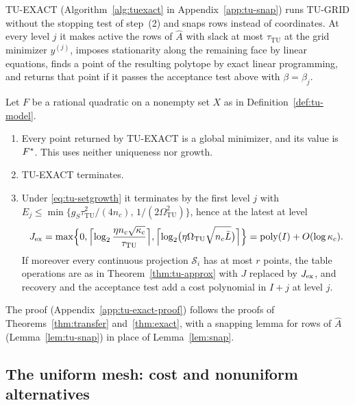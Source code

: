 TU-EXACT (Algorithm~\ref{alg:tuexact} in Appendix~\ref{app:tu-snap}) runs
TU-GRID without the stopping test of step~(2) and snaps rows instead of
coordinates. At every level $j$ it makes active the rows of $\hat A$ with
slack at most $\tau_{\mathrm{TU}}$ at the grid minimizer $y^{(j)}$, imposes
stationarity along the remaining face by linear equations, finds a point of
the resulting polytope by exact linear programming, and returns that point
if it passes the acceptance test above with $\beta=\beta_j$.

\begin{theorem}\label{thm:tu-exact}
Let $F$ be a rational quadratic on a nonempty set $X$ as in
Definition~\ref{def:tu-model}.
\begin{enumerate}[label=(\alph*)]
\item Every point returned by TU-EXACT is a global minimizer, and its value
is $F^{*}$. This uses neither uniqueness nor growth.
\item TU-EXACT terminates.
\item Under \eqref{eq:tu-setgrowth} it terminates by the first level $j$ with
$E_j\le\min\{g_S\tau_{\mathrm{TU}}^2/(4n_c),\,1/(2\Omega_{\mathrm{TU}}^2)\}$,
hence at the latest at level
\[
J_{\rm ex}=\max\Bigl\{0,\Bigl\lceil\log_2\frac{\eta n_c\sqrt{\kappa_c}}{\tau_{\mathrm{TU}}}\Bigr\rceil,
\Bigl\lceil\log_2\bigl(\eta\Omega_{\mathrm{TU}}\sqrt{n_c\bar L}\bigr)\Bigr\rceil\Bigr\}
=\operatorname{poly}(I)+O(\log\kappa_c).
\]
If moreover every continuous projection $\mathcal S_i$ has at most
$r$ points, the table operations are as in Theorem~\ref{thm:tu-approx} with
$J$ replaced by $J_{\rm ex}$, and recovery and the acceptance test add a cost
polynomial in $I+j$ at level $j$.
\end{enumerate}
\end{theorem}

The proof (Appendix~\ref{app:tu-exact-proof}) follows the proofs of
Theorems~\ref{thm:transfer} and~\ref{thm:exact}, with a snapping lemma for
rows of $\hat A$ (Lemma~\ref{lem:tu-snap}) in place of
Lemma~\ref{lem:snap}.

\subsection{The uniform mesh: cost and nonuniform alternatives}\label{sec:tu-limits}

